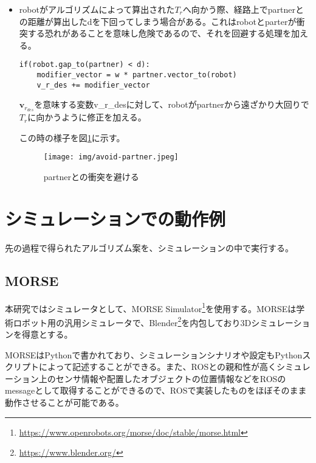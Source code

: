 \documentclass{kuisthesis}
\begin{document}
\begin{itemize}
\vspace{1.0em}

\item robotがアルゴリズムによって算出された$T_r$へ向かう際、経路上でpartnerとの距離が算出したdを下回ってしまう場合がある。これはrobotとparterが衝突する恐れがあることを意味し危険であるので、それを回避する処理を加える。

\begin{lstlisting}
if(robot.gap_to(partner) < d):
	modifier_vector = w * partner.vector_to(robot)
	v_r_des += modifier_vector
\end{lstlisting}

$\bm{v}_r_{des}$を意味する変数v\_r\_desに対して、robotがpartnerから遠ざかり大回りで$T_r$に向かうように修正を加える。

この時の様子を図\ref{fig:avoid-partner}に示す。

\begin{figure}[h]\begin{center}
	\texttt{[image: img/avoid-partner.jpeg]}
	\caption{partnerとの衝突を避ける}
	\label{fig:avoid-partner}
\end{center}\end{figure}

\end{itemize}




\section{シミュレーションでの動作例}

先の過程で得られたアルゴリズム案を、シミュレーションの中で実行する。

\subsection{MORSE}

本研究ではシミュレータとして、MORSE Simulator\footnote{\url{https://www.openrobots.org/morse/doc/stable/morse.html}}を使用する。MORSEは学術ロボット用の汎用シミュレータで、Blender\footnote{\url{https://www.blender.org/}}を内包しており3Dシミュレーションを得意とする。

MORSEはPythonで書かれており、シミュレーションシナリオや設定もPythonスクリプトによって記述することができる。また、ROSとの親和性が高くシミュレーション上のセンサ情報や配置したオブジェクトの位置情報などをROSのmessageとして取得することができるので、ROSで実装したものをほぼそのまま動作させることが可能である。
\end{document}
